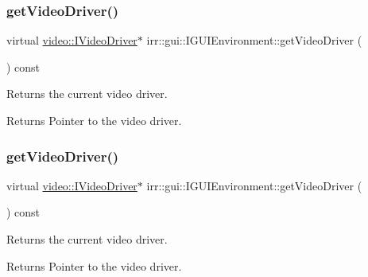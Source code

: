 \subsubsection{\texorpdfstring{get\+Video\+Driver()}{getVideoDriver()}\hspace{0.1cm}{\footnotesize\ttfamily [1/2]}}
{\footnotesize\ttfamily virtual \hyperlink{classirr_1_1video_1_1IVideoDriver}{video\+::\+I\+Video\+Driver}$\ast$ irr\+::gui\+::\+I\+G\+U\+I\+Environment\+::get\+Video\+Driver (\begin{DoxyParamCaption}{ }\end{DoxyParamCaption}) const\hspace{0.3cm}{\ttfamily [pure virtual]}}



Returns the current video driver. 

\begin{DoxyReturn}{Returns}
Pointer to the video driver. 
\end{DoxyReturn}
\mbox{\label{classirr_1_1gui_1_1IGUIEnvironment_a48f5e442f0a2074a531234ab83148fe2}} 
\subsubsection{\texorpdfstring{get\+Video\+Driver()}{getVideoDriver()}\hspace{0.1cm}{\footnotesize\ttfamily [2/2]}}
{\footnotesize\ttfamily virtual \hyperlink{classirr_1_1video_1_1IVideoDriver}{video\+::\+I\+Video\+Driver}$\ast$ irr\+::gui\+::\+I\+G\+U\+I\+Environment\+::get\+Video\+Driver (\begin{DoxyParamCaption}{ }\end{DoxyParamCaption}) const\hspace{0.3cm}{\ttfamily [pure virtual]}}



Returns the current video driver. 

\begin{DoxyReturn}{Returns}
Pointer to the video driver. 
\end{DoxyReturn}
\mbox{\label{classirr_1_1gui_1_1IGUIEnvironment_a88c483f30a0f35debed70e8e51836552}} 
